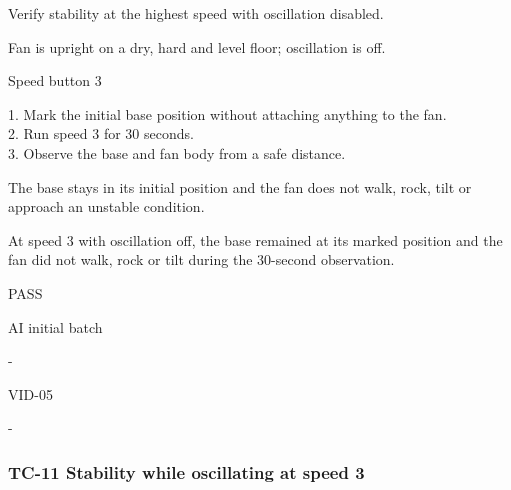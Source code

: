 \begin{description}[style=nextline,leftmargin=3.2cm]

\item[Objective] Verify stability at the highest speed with oscillation disabled.

\item[Preconditions] Fan is upright on a dry, hard and level floor; oscillation is off.

\item[Input] Speed button 3

\item[Steps] 1. Mark the initial base position without attaching anything to the fan.\\ 2. Run speed 3 for 30 seconds.\\ 3. Observe the base and fan body from a safe distance.

\item[Expected] The base stays in its initial position and the fan does not walk, rock, tilt or approach an unstable condition.

\item[Actual] At speed 3 with oscillation off, the base remained at its marked position and the fan did not walk, rock or tilt during the 30-second observation.

\item[Verdict] PASS

\item[Source] AI initial batch

\item[Edge case] -

\item[Video] VID-05

\item[Issue] -

\end{description}

\clearpage

\subsubsection{TC-11 Stability while oscillating at speed 3}

